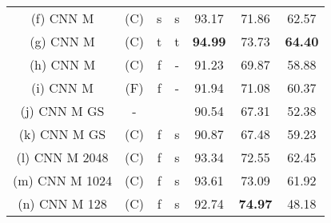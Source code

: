 \documentclass[a4paper,twoside]{article}
\begin{document}
\begin{table*}[t]
\begin{tabular}{cccc|ccc}
(f) CNN M                                                 & (C)                          & s                        & s                        & 93.17              & 71.86              & 62.57          \\
(g) CNN M                                                 & (C)                          & t                        & t                        & \textbf{94.99}     & 73.73              & \textbf{64.40} \\
(h) CNN M                                                 & (C)                          & f                        & -                        & 91.23              & 69.87              & 58.88          \\
(i) CNN M                                                 & (F)                          & f                        & -                        & 91.94              & 71.08              & 60.37          \\
(j) CNN M GS                                              & -                            &                          &                          & 90.54              & 67.31              & 52.38          \\
(k) CNN M GS                                              & (C)                          & f                        & s                        & 90.87              & 67.48              & 59.23          \\ \hline
(l) CNN M 2048                                            & (C)                          & f                        & s                        & 93.34              & 72.55              & 62.45          \\
(m) CNN M 1024                                            & (C)                          & f                        & s                        & 93.61              & 73.09              & 61.92          \\
(n) CNN M 128                                             & (C)                          & f                        & s                        & 92.74              & \textbf{74.97}     & 48.18          \\ \hline
\end{tabular}
\end{table*}
\end{document}
